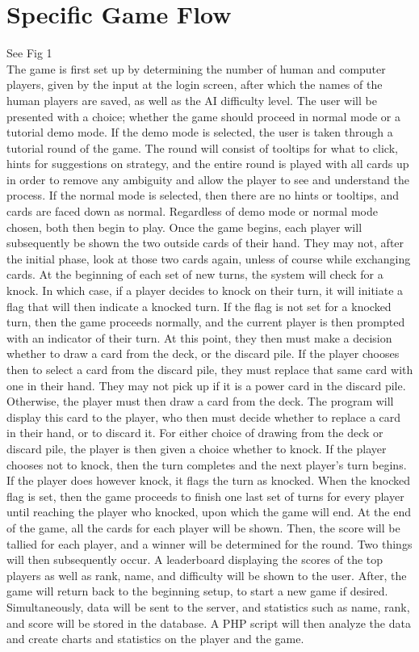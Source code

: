 \documentclass[11pt]{article}
\begin{document}
\section*{Specific Game Flow}
See Fig 1\\
The game is first set up by determining the number of human and computer players, given by the input at the login screen, after which the names of the human players are saved, as well as the AI difficulty level. The user will be presented with a choice; whether the game should proceed in normal mode or a tutorial demo mode. If the demo mode is selected, the user is taken through a tutorial round of the game. The round will consist of tooltips for what to click, hints for suggestions on strategy, and the entire round is played with all cards up in order to remove any ambiguity and allow the player to see and understand the process. If the normal mode is selected, then there are no hints or tooltips, and cards are faced down as normal. Regardless of demo mode or normal mode chosen, both then begin to play. Once the game begins, each player will subsequently be shown the two outside cards of their hand. They may not, after the initial phase, look at those two cards again, unless of course while exchanging cards. At the beginning of each set of new turns, the system will check for a knock. In which case, if a player decides to knock on their turn, it will initiate a flag that will then indicate a knocked turn. If the flag is not set for a knocked turn, then the game proceeds normally, and the current player is then prompted with an indicator of their turn. At this point, they then must make a decision whether to draw a card from the deck, or the discard pile. If the player chooses then to select a card from the discard pile, they must replace that same card with one in their hand. They may not pick up if it is a power card in the discard pile. Otherwise, the player must then draw a card from the deck. The program will display this card to the player, who then must decide whether to replace a card in their hand, or to discard it. For either choice of drawing from the deck or discard pile, the player is then given a choice whether to knock. If the player chooses not to knock, then the turn completes and the next player’s turn begins. If the player does however knock, it flags the turn as knocked. When the knocked flag is set, then the game proceeds to finish one last set of turns for every player until reaching the player who knocked, upon which the game will end. At the end of the game, all the cards for each player will be shown. Then, the score will be tallied for each player, and a winner will be determined for the round. Two things will then subsequently occur. A leaderboard displaying the scores of the top players as well as rank, name, and difficulty will be shown to the user. After, the game will return back to the beginning setup, to start a new game if desired. Simultaneously, data will be sent to the server, and statistics such as name, rank, and score will be stored in the database. A PHP script will then analyze the data and create charts and statistics on the player and the game.
\end{document}
